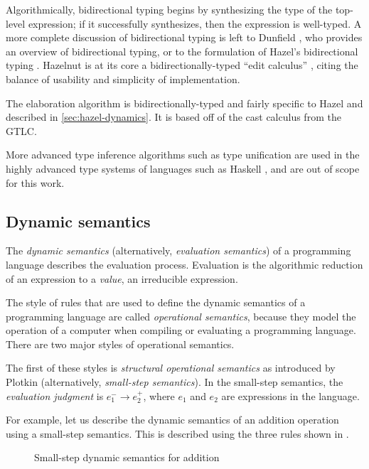 Algorithmically, bidirectional typing begins by synthesizing the type of the top-level expression; if it successfully synthesizes, then the expression is well-typed. A more complete discussion of bidirectional typing is left to Dunfield \cite{Dunfield_2022}, who provides an overview of bidirectional typing, or to the formulation of Hazel's bidirectional typing \cite{conf/popl/Hazelnut17}. Hazelnut is at its core a bidirectionally-typed ``edit calculus'' \cite{conf/popl/Hazelnut17}, citing the balance of usability and simplicity of implementation.

The elaboration algorithm is bidirectionally-typed and fairly specific to Hazel and described in \cref{sec:hazel-dynamics}. It is based off of the cast calculus from the GTLC.

More advanced type inference algorithms such as type unification are used in the highly advanced type systems of languages such as Haskell \cite{gundry2013type}, and are out of scope for this work.

\subsection{Dynamic semantics}
\label{sec:dynamic-semantics}

The \textit{dynamic semantics} (alternatively, \textit{evaluation semantics}) of a programming language describes the evaluation process. Evaluation is the algorithmic reduction of an expression to a \textit{value}, an irreducible expression.

The style of rules that are used to define the dynamic semantics of a programming language are called \textit{operational semantics}, because they model the operation of a computer when compiling or evaluating a programming language. There are two major styles of operational semantics.

The first of these styles is \textit{structural operational semantics} as introduced by Plotkin \cite{plotkin1981structural} (alternatively, \textit{small-step semantics}). In the small-step semantics, the \textit{evaluation judgment} is $e_1^-\to e_2^+$, where $e_1$ and $e_2$ are expressions in the language.

For example, let us describe the dynamic semantics of an addition operation using a small-step semantics. This is described using the three rules shown in .

\begin{figure}
  \centering
  \begin{mdframed}
    \begin{singlespace}
    \end{singlespace}
  \end{mdframed}
  \caption{Small-step dynamic semantics for addition}
  \label{fig:small-step-addition}
\end{figure}

